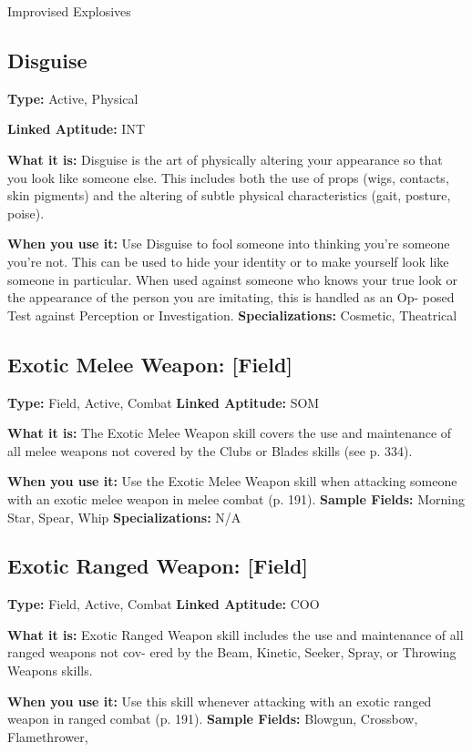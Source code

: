 Improvised Explosives

\subsection{Disguise}


\textbf{Type:} Active, Physical

\textbf{Linked Aptitude:} INT

\textbf{What it is: }Disguise is the art of physically altering 
your appearance so that you look like someone else. 
This includes both the use of props (wigs, contacts, 
skin pigments) and the altering of subtle physical 
characteristics (gait, posture, poise).

\textbf{When you use it:} Use Disguise to fool someone into 
thinking you're someone you're not. This can be used 
to hide your identity or to make yourself look like 
someone in particular. When used against someone 
who knows your true look or the appearance of the 
person you are imitating, this is handled as an Op-
posed Test against Perception or Investigation.
\textbf{Specializations:} Cosmetic, Theatrical

\subsection{Exotic Melee Weapon: [Field]}

\textbf{Type:} Field, Active, Combat
\textbf{Linked Aptitude:} SOM

\textbf{What it is:} The Exotic Melee Weapon skill covers 
the use and maintenance of all melee weapons not 
covered by the Clubs or Blades skills (see p. 334).

\textbf{When you use it:} Use the Exotic Melee Weapon skill 
when attacking someone with an exotic melee weapon 
in melee combat (p. 191).
\textbf{Sample Fields:} Morning Star, Spear, Whip
\textbf{Specializations:} N/A

\subsection{Exotic Ranged Weapon: [Field]}

\textbf{Type:} Field, Active, Combat
\textbf{Linked Aptitude:} COO

\textbf{What it is:} Exotic Ranged Weapon skill includes the 
use and maintenance of all ranged weapons not cov-
ered by the Beam, Kinetic, Seeker, Spray, or Throwing 
Weapons skills.

\textbf{When you use it:} Use this skill whenever attacking with 
an exotic ranged weapon in ranged combat (p. 191).
\textbf{Sample Fields:} Blowgun, Crossbow, Flamethrower, 


